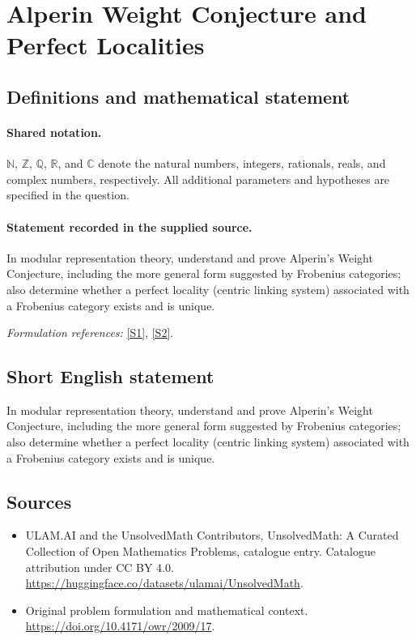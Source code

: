 \documentclass[11pt]{article}
\newcommand{\sref}[2]{\hyperlink{source:#1:#2}{[S#2]}}
\begin{document}
\section{Alperin Weight Conjecture and Perfect Localities}\label{statement}

\subsection{Definitions and mathematical statement}

\paragraph{Shared notation.}$\mathbb N$, $\mathbb Z$, $\mathbb Q$, $\mathbb R$, and $\mathbb C$ denote the natural numbers, integers, rationals, reals, and complex numbers, respectively. All additional parameters and hypotheses are specified in the question.


\paragraph{Statement recorded in the supplied source.}
In modular representation theory, understand and prove Alperin's Weight Conjecture, including the more general form suggested by Frobenius categories; also determine whether a perfect locality (centric linking system) associated with a Frobenius category exists and is unique.
\par\smallskip\textit{Formulation references:} \sref{statement}{1}, \sref{statement}{2}.
\subsection{Short English statement}
In modular representation theory, understand and prove Alperin's Weight Conjecture, including the more general form suggested by Frobenius categories; also determine whether a perfect locality (centric linking system) associated with a Frobenius category exists and is unique.
\subsection{Sources}
\begin{itemize}
\item[\hypertarget{source:statement:1}{S1}] ULAM.AI and the UnsolvedMath Contributors, UnsolvedMath: A Curated Collection of Open Mathematics Problems, catalogue entry. Catalogue attribution under CC BY 4.0.
\url{https://huggingface.co/datasets/ulamai/UnsolvedMath}.
\item[\hypertarget{source:statement:2}{S2}] Original problem formulation and mathematical context.
\url{https://doi.org/10.4171/owr/2009/17}.
\end{itemize}
\label{end:statement}
\end{document}

